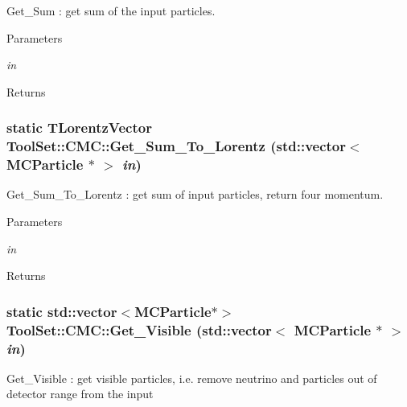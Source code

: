 Get\_\-Sum : get sum of the input particles. 
\begin{DoxyParams}{Parameters}
\item[{\em in}]\end{DoxyParams}
\begin{DoxyReturn}{Returns}

\end{DoxyReturn}
\hypertarget{classToolSet_1_1CMC_a05e74f0cd1f7ceac70fa8d2e38d3a2ab}{
\subsubsection[{Get\_\-Sum\_\-To\_\-Lorentz}]{\setlength{\rightskip}{0pt plus 5cm}static TLorentzVector ToolSet::CMC::Get\_\-Sum\_\-To\_\-Lorentz (std::vector$<$ MCParticle $\ast$ $>$ {\em in})}}
\label{classToolSet_1_1CMC_a05e74f0cd1f7ceac70fa8d2e38d3a2ab}


Get\_\-Sum\_\-To\_\-Lorentz : get sum of input particles, return four momentum. 
\begin{DoxyParams}{Parameters}
\item[{\em in}]\end{DoxyParams}
\begin{DoxyReturn}{Returns}

\end{DoxyReturn}
\hypertarget{classToolSet_1_1CMC_a78794985a367cc765ffca587136c5a6c}{
\subsubsection[{Get\_\-Visible}]{\setlength{\rightskip}{0pt plus 5cm}static std::vector$<$MCParticle$\ast$$>$ ToolSet::CMC::Get\_\-Visible (std::vector$<$ MCParticle $\ast$ $>$ {\em in})}}
\label{classToolSet_1_1CMC_a78794985a367cc765ffca587136c5a6c}


Get\_\-Visible : get visible particles, i.e. remove neutrino and particles out of detector range from the input


